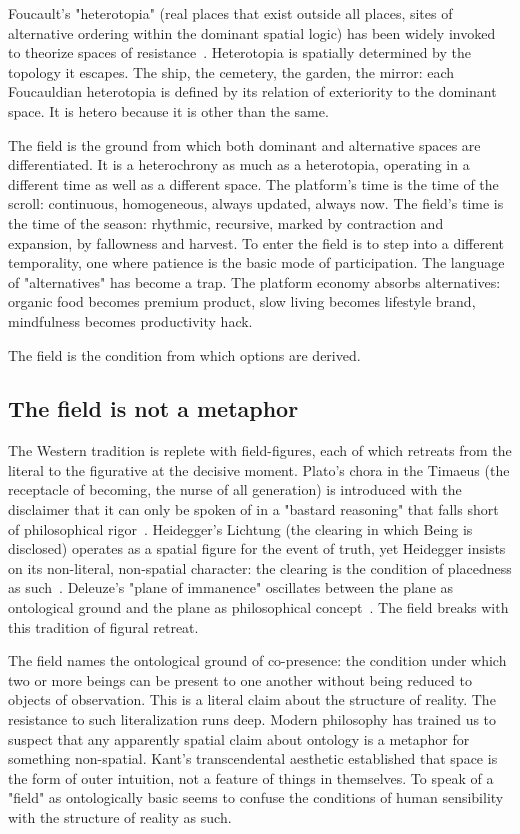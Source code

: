 Foucault's "heterotopia" (real places that exist outside all places, sites of alternative ordering within the dominant spatial logic) has been widely invoked to theorize spaces of resistance~\cite{foucault1984}. Heterotopia is spatially determined by the topology it escapes. The ship, the cemetery, the garden, the mirror: each Foucauldian heterotopia is defined by its relation of exteriority to the dominant space. It is hetero because it is other than the same.

The field is the ground from which both dominant and alternative spaces are differentiated. It is a heterochrony as much as a heterotopia, operating in a different time as well as a different space. The platform's time is the time of the scroll: continuous, homogeneous, always updated, always now. The field's time is the time of the season: rhythmic, recursive, marked by contraction and expansion, by fallowness and harvest. To enter the field is to step into a different temporality, one where patience is the basic mode of participation. The language of "alternatives" has become a trap. The platform economy absorbs alternatives: organic food becomes premium product, slow living becomes lifestyle brand, mindfulness becomes productivity hack.

The field is the condition from which options are derived.

\subsection{The field is not a metaphor}

The Western tradition is replete with field-figures, each of which retreats from the literal to the figurative at the decisive moment. Plato's chora in the Timaeus (the receptacle of becoming, the nurse of all generation) is introduced with the disclaimer that it can only be spoken of in a "bastard reasoning" that falls short of philosophical rigor~\cite[49a--52d]{plato_timaeus}. Heidegger's Lichtung (the clearing in which Being is disclosed) operates as a spatial figure for the event of truth, yet Heidegger insists on its non-literal, non-spatial character: the clearing is the condition of placedness as such~\cite{heidegger1927being}. Deleuze's "plane of immanence" oscillates between the plane as ontological ground and the plane as philosophical concept~\cite{deleuzeguattari1991}. The field breaks with this tradition of figural retreat.

The field names the ontological ground of co-presence: the condition under which two or more beings can be present to one another without being reduced to objects of observation. This is a literal claim about the structure of reality. The resistance to such literalization runs deep. Modern philosophy has trained us to suspect that any apparently spatial claim about ontology is a metaphor for something non-spatial. Kant's transcendental aesthetic established that space is the form of outer intuition, not a feature of things in themselves. To speak of a "field" as ontologically basic seems to confuse the conditions of human sensibility with the structure of reality as such.

